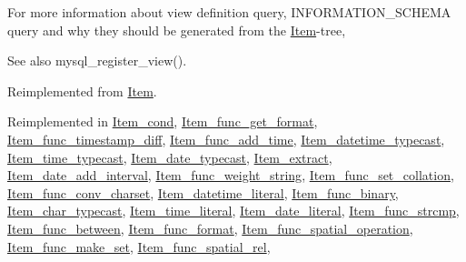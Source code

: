For more information about view definition query, I\+N\+F\+O\+R\+M\+A\+T\+I\+O\+N\+\_\+\+S\+C\+H\+E\+MA query and why they should be generated from the \mbox{\hyperlink{classItem}{Item}}-\/tree, \begin{DoxySeeAlso}{See also}
mysql\+\_\+register\+\_\+view(). 
\end{DoxySeeAlso}


Reimplemented from \mbox{\hyperlink{classItem_aa7ba4bde739d83adec8edf3bf1596d94}{Item}}.



Reimplemented in \mbox{\hyperlink{classItem__cond_ac31bdc524e6febf5e6b1ac0874064400}{Item\+\_\+cond}}, \mbox{\hyperlink{classItem__func__get__format_a9de8cf490a3cdfbef5f1c7e42e0d20f2}{Item\+\_\+func\+\_\+get\+\_\+format}}, \mbox{\hyperlink{classItem__func__timestamp__diff_ad6f3cff0c7490aaabba3e11f18de66ec}{Item\+\_\+func\+\_\+timestamp\+\_\+diff}}, \mbox{\hyperlink{classItem__func__add__time_a29dd981b554a30df77ea0c3a24fd308c}{Item\+\_\+func\+\_\+add\+\_\+time}}, \mbox{\hyperlink{classItem__datetime__typecast_a0b5814efb8176acce656e2f7d4ad9185}{Item\+\_\+datetime\+\_\+typecast}}, \mbox{\hyperlink{classItem__time__typecast_aee10e9840d9d9bce9887ac3d49f8729c}{Item\+\_\+time\+\_\+typecast}}, \mbox{\hyperlink{classItem__date__typecast_a57c9ad045bd8ff8cebe022dd4868f47c}{Item\+\_\+date\+\_\+typecast}}, \mbox{\hyperlink{classItem__extract_a5a2c762763085131a38bd15816bd361b}{Item\+\_\+extract}}, \mbox{\hyperlink{classItem__date__add__interval_aef41086a34899cc2cfa46ab05a46dc7a}{Item\+\_\+date\+\_\+add\+\_\+interval}}, \mbox{\hyperlink{classItem__func__weight__string_a57eca2ad6eba0b12baba9fc800b77013}{Item\+\_\+func\+\_\+weight\+\_\+string}}, \mbox{\hyperlink{classItem__func__set__collation_a9d8a3b08d2d4c55fc9ab038bef3ce1b5}{Item\+\_\+func\+\_\+set\+\_\+collation}}, \mbox{\hyperlink{classItem__func__conv__charset_ac8281c66d90d6a9b818dde781f63d28f}{Item\+\_\+func\+\_\+conv\+\_\+charset}}, \mbox{\hyperlink{classItem__datetime__literal_a96ac54156ec3267f4913e3fbed7837a1}{Item\+\_\+datetime\+\_\+literal}}, \mbox{\hyperlink{classItem__func__binary_a844fa037571955cec5ce1a8d64eb33c1}{Item\+\_\+func\+\_\+binary}}, \mbox{\hyperlink{classItem__char__typecast_adf128fa02d763bb58d3501358a1d1e1a}{Item\+\_\+char\+\_\+typecast}}, \mbox{\hyperlink{classItem__time__literal_a4e8dca3ff39e2a0ecd40373f083f9b14}{Item\+\_\+time\+\_\+literal}}, \mbox{\hyperlink{classItem__date__literal_af4a9546a669fb4f62178869b7e79f553}{Item\+\_\+date\+\_\+literal}}, \mbox{\hyperlink{classItem__func__strcmp_a524a65bbd7fcff131c5ba9547cfe79e4}{Item\+\_\+func\+\_\+strcmp}}, \mbox{\hyperlink{classItem__func__between_ad23dd8c7e58553158f25fe513e5964fd}{Item\+\_\+func\+\_\+between}}, \mbox{\hyperlink{classItem__func__format_aaf19ba682a8f2acb947222addb55b0d2}{Item\+\_\+func\+\_\+format}}, \mbox{\hyperlink{classItem__func__spatial__operation_ac7bb51665071406b92daf9728254fdfe}{Item\+\_\+func\+\_\+spatial\+\_\+operation}}, \mbox{\hyperlink{classItem__func__make__set_a906cb74c980690ae9a7c767d111da188}{Item\+\_\+func\+\_\+make\+\_\+set}}, \mbox{\hyperlink{classItem__func__spatial__rel_aa0e96f4e0cebc9ea671b253d885f4ab9}{Item\+\_\+func\+\_\+spatial\+\_\+rel}}, 